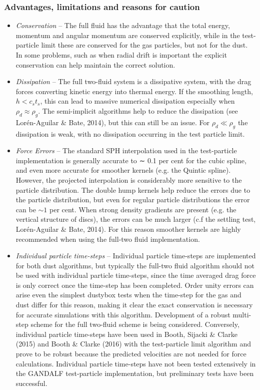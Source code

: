 \documentclass[a4paper]{article}
\begin{document}
\subsubsection{Advantages, limitations and reasons for caution}

\begin{itemize}
\item \emph{Conservation} -- The full fluid has the advantage that the total energy, momentum and angular momentum
are conserved explicitly, while in the test-particle limit these are conserved for the gas particles, but not for the dust. In some problems, such as when radial drift is important the explicit conservation can help maintain the correct solution.

\item \emph{Dissipation} -- The full two-fluid system is a dissipative system, with the drag forces converting kinetic energy into thermal energy. If the smoothing length, $h < c_s t_s$, this can lead to massive numerical dissipation especially when $\rho_d \approx \rho_g$. The semi-implicit algorithms help to reduce the dissipation (see Lor\'en-Aguilar \& Bate, 2014), but this can still be an issue. For $\rho_d \ll \rho_g$ the dissipation is weak, with no dissipation occurring in the test particle limit. 

\item \emph{Force Errors} -- The standard SPH interpolation used in the test-particle implementation is generally accurate to ∼ 0.1 per cent for the cubic spline, and even more accurate for smoother kernels (e.g. the Quintic spline). However, the projected interpolation is considerably more sensitive to the particle distribution. The double hump kernels help reduce the errors due to the particle distribution, but even for regular particle distributions the error can be $\sim 1$ per cent. When strong density gradients are present (e.g. the vertical structure of discs), the errors can be much larger (c.f the settling test, Lor\'en-Aguilar \& Bate, 2014). For this reason smoother kernels are highly recommended when using the full-two fluid implementation. 

\item \emph{Individual particle time-steps} -- Individual particle time-steps are implemented for both dust algorithms, but typically the full-two fluid algorithm should not be used with individual particle time-steps, since the time averaged drag force is only correct once the time-step has been completed. Order unity errors can arise even the simplest dustybox tests when the time-step for the gas and dust differ for this reason, making it clear the exact conservation is necessary for accurate simulations with this algorithm. Development of a robust multi-step scheme for the full two-fluid scheme is being considered. Conversely, individual particle time-steps have been used in Booth, Sijacki \& Clarke (2015) and Booth \& Clarke (2016) with the test-particle limit algorithm and prove to be robust because the predicted velocities are not needed for force calculations. Individual particle time-steps have not been tested extensively in the GANDALF test-particle implementation, but preliminary tests have been successful.
\end{itemize}
\end{document}
